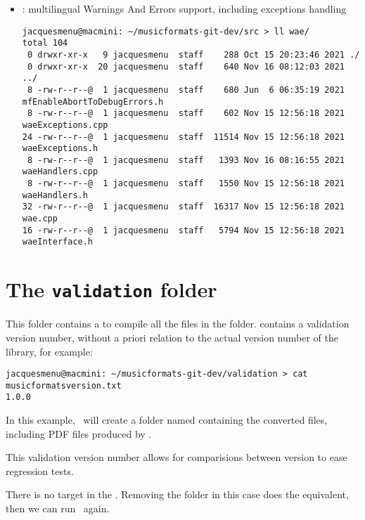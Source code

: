 \begin{itemize}
\item {} : multilingual Warnings And Errors support, including exceptions handling
\begin{lstlisting}[language=Terminal]
jacquesmenu@macmini: ~/musicformats-git-dev/src > ll wae/
total 104
 0 drwxr-xr-x   9 jacquesmenu  staff    288 Oct 15 20:23:46 2021 ./
 0 drwxr-xr-x  20 jacquesmenu  staff    640 Nov 16 08:12:03 2021 ../
 8 -rw-r--r--@  1 jacquesmenu  staff    680 Jun  6 06:35:19 2021 mfEnableAbortToDebugErrors.h
 8 -rw-r--r--@  1 jacquesmenu  staff    602 Nov 15 12:56:18 2021 waeExceptions.cpp
24 -rw-r--r--@  1 jacquesmenu  staff  11514 Nov 15 12:56:18 2021 waeExceptions.h
 8 -rw-r--r--@  1 jacquesmenu  staff   1393 Nov 16 08:16:55 2021 waeHandlers.cpp
 8 -rw-r--r--@  1 jacquesmenu  staff   1550 Nov 15 12:56:18 2021 waeHandlers.h
32 -rw-r--r--@  1 jacquesmenu  staff  16317 Nov 15 12:56:18 2021 wae.cpp
16 -rw-r--r--@  1 jacquesmenu  staff   5794 Nov 15 12:56:18 2021 waeInterface.h
\end{lstlisting}

\end{itemize}


\section{The {\tt validation} folder}

This folder contains a  to compile all the files in the  folder.
 contains a validation version number, without a priori relation to the actual version number of the library, for example:
\begin{lstlisting}[language=Terminal]
jacquesmenu@macmini: ~/musicformats-git-dev/validation > cat musicformatsversion.txt
1.0.0
\end{lstlisting}

In this example, \make\ will create a folder named  containing the converted files, including PDF files produced by .

This validation version number allows for comparisions between version to ease regression tests.

There is no  target in the . Removing the  folder in this case does the equivalent, then we can run \make\ again.




